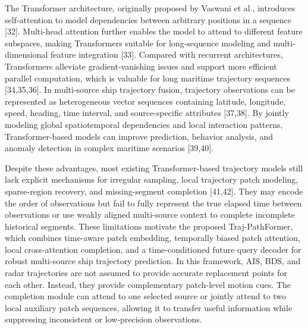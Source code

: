 \documentclass[a4paper,fleqn]{cas-dc}
\begin{document}
The Transformer architecture, originally proposed by Vaswani et al., introduces self-attention to model dependencies between arbitrary positions in a sequence [32]. Multi-head attention further enables the model to attend to different feature subspaces, making Transformers suitable for long-sequence modeling and multi-dimensional feature integration [33]. Compared with recurrent architectures, Transformers alleviate gradient-vanishing issues and support more efficient parallel computation, which is valuable for long maritime trajectory sequences [34,35,36]. In multi-source ship trajectory fusion, trajectory observations can be represented as heterogeneous vector sequences containing latitude, longitude, speed, heading, time interval, and source-specific attributes [37,38]. By jointly modeling global spatiotemporal dependencies and local interaction patterns, Transformer-based models can improve prediction, behavior analysis, and anomaly detection in complex maritime scenarios [39,40].

Despite these advantages, most existing Transformer-based trajectory models still lack explicit mechanisms for irregular sampling, local trajectory patch modeling, sparse-region recovery, and missing-segment completion [41,42]. They may encode the order of observations but fail to fully represent the true elapsed time between observations or use weakly aligned multi-source context to complete incomplete historical segments. These limitations motivate the proposed Traj-PathFormer, which combines time-aware patch embedding, temporally biased patch attention, local cross-attention completion, and a time-conditioned future query decoder for robust multi-source ship trajectory prediction. In this framework, AIS, BDS, and radar trajectories are not assumed to provide accurate replacement points for each other. Instead, they provide complementary patch-level motion cues. The completion module can attend to one selected source or jointly attend to two local auxiliary patch sequences, allowing it to transfer useful information while suppressing inconsistent or low-precision observations.




\printcredits
%





\end{document}
